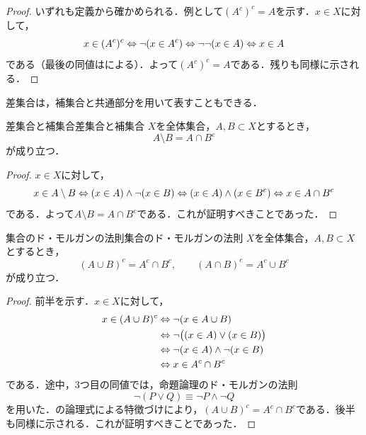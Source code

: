 \begin{tleftbar}
  \begin{proof}
    いずれも定義から確かめられる．例として$(A^c)^c = A$を示す．$x \in X$に対して，
    \[
      x \in (A^c)^c
      \mathrel{\Leftrightarrow} \lnot ( x \in A^c )
      \mathrel{\Leftrightarrow} \lnot \lnot ( x \in A )
      \mathrel{\Leftrightarrow} x \in A
    \]
    である（最後の同値はによる）．よって$(A^c)^c = A$である．残りも同様に示される．
  \end{proof}
\end{tleftbar}

差集合は，補集合と共通部分を用いて表すこともできる．

\begin{prop}{差集合と補集合}{差集合と補集合}
  $X$を全体集合，$A, B \subset X$とするとき，
  \[
    A \setminus B = A \cap B^c
  \]
  が成り立つ．
\end{prop}

\begin{tleftbar}
  \begin{proof}
    $x \in X$に対して，
    \[
      x \in A \setminus B
      \mathrel{\Leftrightarrow} (x \in A) \land \lnot (x \in B)
      \mathrel{\Leftrightarrow} (x \in A) \land (x \in B^c)
      \mathrel{\Leftrightarrow} x \in A \cap B^c
    \]
    である．よって$A \setminus B = A \cap B^c$である．これが証明すべきことであった．
  \end{proof}
\end{tleftbar}

\begin{prop}{集合のド・モルガンの法則}{集合のド・モルガンの法則}
  $X$を全体集合，$A, B \subset X$とするとき，
  \[
    (A \cup B)^c = A^c \cap B^c,
    \qquad
    (A \cap B)^c = A^c \cup B^c
  \]
  が成り立つ．
\end{prop}

\begin{tleftbar}
  \begin{proof}
    前半を示す．$x \in X$に対して，
    \begin{align*}
      x \in (A \cup B)^c
      & \mathrel{\Leftrightarrow} \lnot ( x \in A \cup B ) \\
      & \mathrel{\Leftrightarrow} \lnot \bigl( (x \in A) \lor (x \in B) \bigr) \\
      & \mathrel{\Leftrightarrow} \lnot (x \in A) \land \lnot (x \in B) \\
      & \mathrel{\Leftrightarrow} x \in A^c \cap B^c
    \end{align*}
    である．途中，3つ目の同値では，命題論理のド・モルガンの法則
    \[
      \lnot (P \lor Q) \equiv \lnot P \land \lnot Q
    \]
    を用いた．の論理式による特徴づけにより，$(A \cup B)^c = A^c \cap B^c$である．後半も同様に示される．これが証明すべきことであった．
  \end{proof}
\end{tleftbar}


